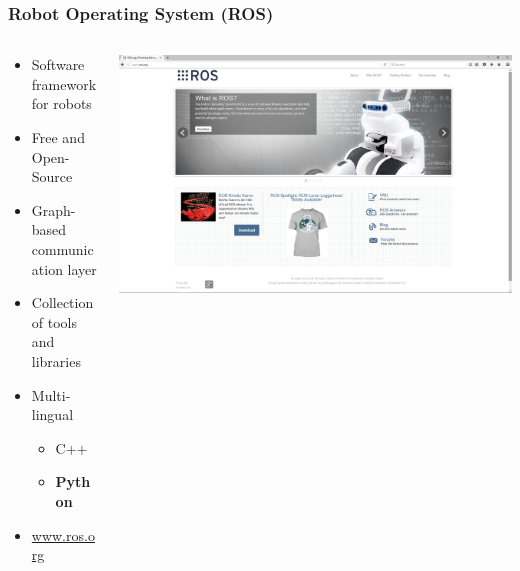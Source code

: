 \documentclass[aspectratio=169]{beamer}
\begin{document}
  \begin{frame}
   \frametitle{Robot Operating System (ROS)}
   \begin{columns}[onlytextwidth]
    \begin{column}{0.5\textwidth}
    
      \begin{itemize}
       \item Software framework for robots 
       \item Free and Open-Source 
       \item Graph-based communication layer 
       \item Collection of tools and libraries 
       \item Multi-lingual 
       \begin{itemize}
	\item C++
	\item \textbf{Python} 
       \end{itemize}
       \item \url{www.ros.org}
      \end{itemize}
    
    \end{column}
    \begin{column}{0.5\textwidth}

    \includegraphics[width=1.5\textwidth]{./Abbildungen/ros_screenshot.png}
    
    \end{column}
   \end{columns}
  \end{frame}
\end{document}
